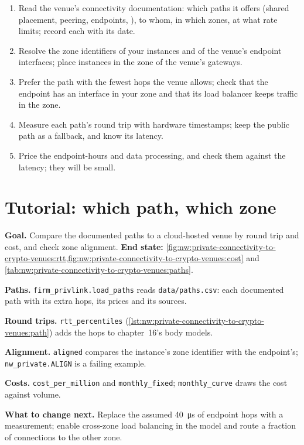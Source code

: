 \begin{method}\label{met:nw:private-connectivity-to-crypto-venues:connect}
\begin{enumerate}
\item Read the venue's connectivity documentation: which paths it offers (shared placement, peering, endpoints, ), to whom, in which
  zones, at what rate limits; record each with its date.
\item Resolve the zone identifiers of your instances and of the venue's endpoint interfaces; place instances in the zone of the venue's gateways.
\item Prefer the path with the fewest hops the venue allows; check that the endpoint has an interface in your zone and that its load balancer keeps
  traffic in the zone.
\item Measure each path's round trip with hardware timestamps; keep the public path as a fallback, and know its latency.
\item Price the endpoint-hours and data processing, and check them against the latency; they will be small.
\end{enumerate}
\end{method}

\section{Tutorial: which path, which zone}\label{tut:nw:private-connectivity-to-crypto-venues:tut}

\begin{tutorial}
\textbf{Goal.} Compare the documented paths to a cloud-hosted venue by round trip and cost, and check zone alignment.
\textbf{End state:} \cref{fig:nw:private-connectivity-to-crypto-venues:rtt,fig:nw:private-connectivity-to-crypto-venues:cost} and
\cref{tab:nw:private-connectivity-to-crypto-venues:paths}.
\begin{tutsteps}
\item \textbf{Paths.} \texttt{firm\_privlink.load\_paths} reads \texttt{data/paths.csv}: each documented path with its extra hops, its prices and its
  sources.
\item \textbf{Round trips.} \texttt{rtt\_percentiles} (\cref{lst:nw:private-connectivity-to-crypto-venues:path}) adds the hops to chapter~16's body
  models.
\item \textbf{Alignment.} \texttt{aligned} compares the instance's zone identifier with the endpoint's; \texttt{nw\_private.ALIGN} is a failing example.
\item \textbf{Costs.} \texttt{cost\_per\_million} and \texttt{monthly\_fixed}; \texttt{monthly\_curve} draws the cost against volume.
\end{tutsteps}
\textbf{What to change next.} Replace the assumed \qty{40}{\micro\second} of endpoint hops with a measurement; enable cross-zone load balancing in the
model and route a fraction of connections to the other zone.
\end{tutorial}

